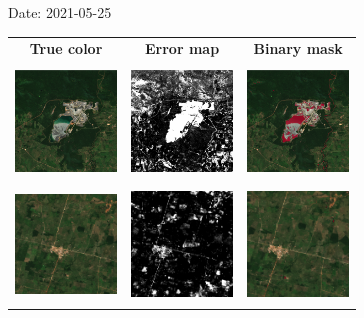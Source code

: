 \documentclass{beamer}
\begin{document}
\begin{frame}{Date: 2021-05-25}
    \begin{tabular}{ccc}
        \textbf{True color} & \textbf{Error map} & \textbf{Binary mask}\\
        \includegraphics[width=2.7cm,height=3cm]{Figures/v6/20210525/TCI_zoom1.png}& \includegraphics[width=2.7cm,height=3cm]{Figures/v6/20210525/error_map_zoom1.png} &\includegraphics[width=2.7cm,height=3cm]{Figures/v6/20210525/zoom1_BI.png}\\
        \includegraphics[width=2.7cm,height=3cm]{Figures/v6/20210525/TCI_zoom2.png}& \includegraphics[width=2.7cm,height=3cm]{Figures/v6/20210525/error_map_zoom2.png} &\includegraphics[width=2.7cm,height=3cm]{Figures/v6/20210525/zoom2_BI.png}\\
        \end{tabular}
\end{frame}
\end{document}
